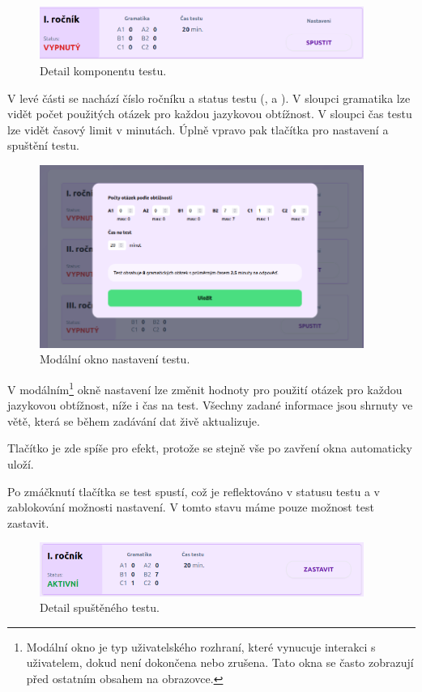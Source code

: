 \begin{figure}[H]
    \centering
    \includegraphics[width=400px]{images/01design/test.png}
    \caption{Detail komponentu testu.}
\end{figure}

V levé části se nachází číslo ročníku a status testu (,  a ). V sloupci gramatika lze vidět počet použitých otázek pro každou jazykovou obtížnost. V sloupci čas testu lze vidět časový limit v minutách. Úplně vpravo pak tlačítka pro nastavení a spuštění testu.

\begin{figure}[H]
    \centering
    \includegraphics[width=400px]{images/01design/test-modal.png}
    \caption{Modální okno nastavení testu.}
\end{figure}

V modálním\footnote{Modální okno je typ uživatelského rozhraní, které vynucuje interakci s uživatelem, dokud není dokončena nebo zrušena. Tato okna se často zobrazují před ostatním obsahem na obrazovce.} okně nastavení lze změnit hodnoty pro použití otázek pro každou jazykovou obtížnost, níže i čas na test. Všechny zadané informace jsou shrnuty ve větě, která se během zadávání dat živě aktualizuje.

Tlačítko  je zde spíše pro efekt, protože se stejně vše po zavření okna automaticky uloží.

Po zmáčknutí tlačítka  se test spustí, což je reflektováno v statusu testu a v zablokování možnosti nastavení. V tomto stavu máme pouze možnost test zastavit.

\begin{figure}[H]
    \centering
    \includegraphics[width=400px]{images/01design/test-running.png}
    \caption{Detail spuštěného testu.}
\end{figure}

